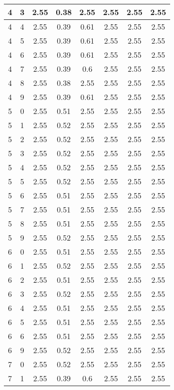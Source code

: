 \begin{longtable}{|c|c||c||c|c||c|c|c|}
	4 & 3 & 2.55 & 0.38 & 2.55 & 2.55 & 2.55 & 2.55 \\ \hline
	4 & 4 & 2.55 & 0.39 & 0.61 & 2.55 & 2.55 & 2.55 \\ \hline
	4 & 5 & 2.55 & 0.39 & 0.61 & 2.55 & 2.55 & 2.55 \\ \hline
	4 & 6 & 2.55 & 0.39 & 0.61 & 2.55 & 2.55 & 2.55 \\ \hline
	4 & 7 & 2.55 & 0.39 & 0.6 & 2.55 & 2.55 & 2.55 \\ \hline
	4 & 8 & 2.55 & 0.38 & 2.55 & 2.55 & 2.55 & 2.55 \\ \hline
	4 & 9 & 2.55 & 0.39 & 0.61 & 2.55 & 2.55 & 2.55 \\ \hline
	5 & 0 & 2.55 & 0.51 & 2.55 & 2.55 & 2.55 & 2.55 \\ \hline
	5 & 1 & 2.55 & 0.52 & 2.55 & 2.55 & 2.55 & 2.55 \\ \hline
	5 & 2 & 2.55 & 0.52 & 2.55 & 2.55 & 2.55 & 2.55 \\ \hline
	5 & 3 & 2.55 & 0.52 & 2.55 & 2.55 & 2.55 & 2.55 \\ \hline
	5 & 4 & 2.55 & 0.52 & 2.55 & 2.55 & 2.55 & 2.55 \\ \hline
	5 & 5 & 2.55 & 0.52 & 2.55 & 2.55 & 2.55 & 2.55 \\ \hline
	5 & 6 & 2.55 & 0.51 & 2.55 & 2.55 & 2.55 & 2.55 \\ \hline
	5 & 7 & 2.55 & 0.51 & 2.55 & 2.55 & 2.55 & 2.55 \\ \hline
	5 & 8 & 2.55 & 0.51 & 2.55 & 2.55 & 2.55 & 2.55 \\ \hline
	5 & 9 & 2.55 & 0.52 & 2.55 & 2.55 & 2.55 & 2.55 \\ \hline
	6 & 0 & 2.55 & 0.51 & 2.55 & 2.55 & 2.55 & 2.55 \\ \hline
	6 & 1 & 2.55 & 0.52 & 2.55 & 2.55 & 2.55 & 2.55 \\ \hline
	6 & 2 & 2.55 & 0.51 & 2.55 & 2.55 & 2.55 & 2.55 \\ \hline
	6 & 3 & 2.55 & 0.52 & 2.55 & 2.55 & 2.55 & 2.55 \\ \hline
	6 & 4 & 2.55 & 0.51 & 2.55 & 2.55 & 2.55 & 2.55 \\ \hline
	6 & 5 & 2.55 & 0.51 & 2.55 & 2.55 & 2.55 & 2.55 \\ \hline
	6 & 6 & 2.55 & 0.51 & 2.55 & 2.55 & 2.55 & 2.55 \\ \hline
	6 & 9 & 2.55 & 0.52 & 2.55 & 2.55 & 2.55 & 2.55 \\ \hline
	7 & 0 & 2.55 & 0.52 & 2.55 & 2.55 & 2.55 & 2.55 \\ \hline
	7 & 1 & 2.55 & 0.39 & 0.6 & 2.55 & 2.55 & 2.55 \\ \hline

\end{longtable}
